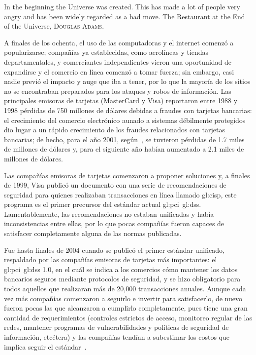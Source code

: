 %
%
%

{
  \epigrafe
  {%
    In the beginning the Universe was created. This has made a lot of people
    very angry and has been widely regarded as a bad move.%
  }
  {%
    The Restaurant at the End of the Universe,
    \textsc{Douglas Adams}.%
  }
}

\noindent
A finales de los ochenta, el uso de las computadoras y el internet comenzó a
popularizarse; compañías ya establecidas, como aerolíneas y tiendas
departamentales, y comerciantes independientes vieron una oportunidad de
expandirse y el comercio en línea comenzó a tomar fuerza; sin embargo, casi
nadie previó el impacto y auge que iba a tener, por lo que la mayoría de los
sitios no se encontraban preparados para los ataques y robos de información.
Las principales emisoras de tarjetas (MasterCard y Visa) reportaron entre 1988 y
1998 pérdidas de 750 millones de dólares debidas a fraudes con
tarjetas bancarias: el crecimiento del comercio electrónico aunado a
sistemas débilmente protegidos dio lugar a un rápido crecimiento de los
fraudes relacionados con tarjetas bancarias; de hecho, para el año 2001,
según~\cite{wallethub}, se tuvieron pérdidas de 1.7 miles de millones de
dólares y, para el siguiente año habían aumentado a 2.1 miles de millones de
dólares.

Las compañías emisoras de tarjetas comenzaron a proponer soluciones y,
a finales de 1999, Visa publicó un documento con una serie de recomendaciones
de seguridad para quienes realizaban transacciones en línea llamado
\gls{gl:cisp}, este programa es el primer precursor del estándar actual
\gls{gl:pci}~\gls{gl:dss}. Lamentablemente, las recomendaciones no estaban
unificadas y había inconsistencias entre ellas, por lo que pocas compañías
fueron capaces de satisfacer completamente alguna de las normas publicadas.

Fue hasta finales de 2004 cuando se publicó el primer estándar unificado,
respaldado por las compañías emisoras de tarjetas más importantes: el
\gls{gl:pci}~\gls{gl:dss} 1.0, en el cuál se indica a los comercios cómo
mantener los datos bancarios seguros mediante protocolos de seguridad, y se hizo
obligatorio para todos aquellos que realizaran más de 20,000 transacciones
anuales. Aunque cada vez más compañías comenzaron a seguirlo e invertir para
satisfacerlo, de nuevo fueron pocas las que alcanzaron a cumplirlo
completamente, pues tiene una gran cantidad de requerimientos (controles
estrictos de acceso, monitoreo regular de las redes, mantener programas de
vulnerabilidades y políticas de seguridad de información, etcétera) y las
compañías tendían a subestimar los costos que implica seguir el
estándar~\cite{uk_association, search_security}.

